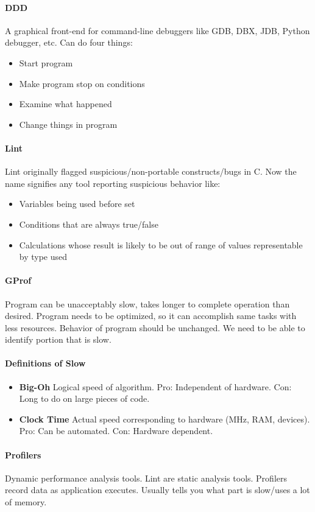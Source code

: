 \documentclass[12 pt]{article}
\begin{document}
\paragraph{DDD}A graphical front-end for command-line debuggers like GDB, DBX, JDB, Python debugger, etc. Can do four things:
\begin{itemize}
\item Start program
\item Make program stop on conditions
\item Examine what happened
\item Change things in program
\end{itemize}
\paragraph{Lint} Lint originally flagged suspicious/non-portable constructs/bugs in C. Now the name signifies any tool reporting suspicious behavior like:
\begin{itemize}
\item Variables being used before set
\item Conditions that are always true/false
\item Calculations whose result is likely to be out of range of values representable by type used
\end{itemize}
\paragraph{GProf} Program can be unacceptably slow, takes longer to complete operation than desired. Program needs to be optimized, so it can accomplish same tasks with less resources. Behavior of program should be unchanged. We need to be able to identify portion that is slow.
\paragraph{Definitions of Slow}
\begin{itemize}
\item \textbf{Big-Oh} Logical speed of algorithm. Pro: Independent of hardware. Con: Long to do on large pieces of code.
\item \textbf{Clock Time} Actual speed corresponding to hardware (MHz, RAM, devices). Pro: Can be automated. Con: Hardware dependent.
\end{itemize}
\paragraph{Profilers}Dynamic performance analysis tools. Lint are static analysis tools. Profilers record data as application executes. Usually tells you what part is slow/uses a lot of memory.
\end{document}
